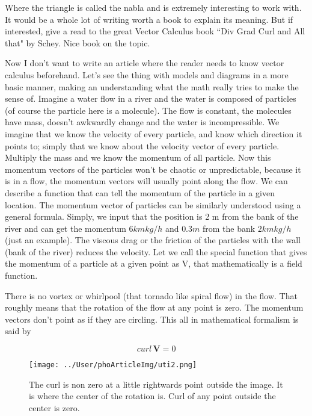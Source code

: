\documentclass[11pt,a4paper,twocolumn,openright]{article}
\renewcommand{\vec}[1]{\boldsymbol{#1}}
\theoremstyle{definition}
\theoremstyle{definition}
\theoremstyle{definition}
\theoremstyle{definition}
\begin{document}
Where the triangle is called the nabla and is extremely interesting to work with. It would be a whole lot of writing worth a book to explain its meaning. But if interested, give a read to the great Vector Calculus book  ``Div Grad Curl and All that" by Schey. Nice book on the topic.  


Now I don't want to write an article where the reader needs to know vector calculus beforehand. Let's see the thing with models and diagrams in a more basic manner, making an understanding what the math really tries to make the sense of. Imagine a water flow in a river and the water is composed of particles (of course the particle here is a molecule). The flow is constant, the molecules have mass, doesn't awkwardly change and the water is incompressible. We imagine that we know the velocity of every particle, and know which direction it points to; simply that we know about the velocity vector of every particle. Multiply the mass and we know the momentum of all particle. Now this momentum vectors of the particles won't be chaotic or unpredictable, because it is in a flow, the momentum vectors will usually point along the flow. We can describe a function that can tell the momentum of the particle in a given location. The momentum vector of particles can be similarly understood using a general formula. Simply, we input that the position is 2 m from the bank of the river and can get the momentum $6kmkg/h$ and $0.3 m$ from the bank $2kmkg/h$ (just an example). The viscous drag or the friction of the particles with the wall (bank of the river) reduces the velocity. Let we call the special function that gives the momentum of a particle at a given point as V, that mathematically is a field function.


There is no vortex or whirlpool (that tornado like spiral flow) in the flow. That roughly means that the rotation of the flow at any point is zero. The momentum vectors don't point as if they are circling. This all in mathematical formalism is said by 

	\begin{equation}
	curl \, \vec{V} = 0
	\end{equation}

\begin{figure}[hbtp]
\centering
\texttt{[image: ../User/phoArticleImg/uti2.png]}
\caption{The curl is non zero at a little rightwards point outside the image. It is where the center of the rotation is. Curl of any point outside the center is zero.}
\end{figure}
\end{document}
